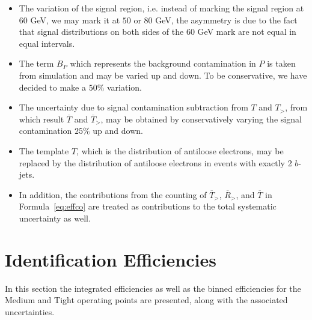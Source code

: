 \begin{itemize}[label=]


	\item The variation of the signal region, i.e. instead of marking the signal
	      region at $60$ GeV, we may mark it at $50$ or $80$ GeV, the asymmetry is due to
	      the fact that signal distributions on both sides of the $60$ GeV mark are not
	      equal in equal intervals.


	\item The term $B_P$ which represents the background contamination in $P$ is
	      taken from simulation and may be varied up and down. To be conservative, we
	      have decided to make a $50\%$ variation.


	\item The uncertainty due to signal contamination subtraction from $T$ and
	      $T_>$, from which result $\overline{T}$ and $\overline{T}_>$, may be obtained
	      by conservatively varying the signal contamination $25\%$ up and down.

	\item The template $T$, which is the distribution of antiloose electrons, may
	      be replaced by the distribution of antiloose electrons in events with exactly 2
	      $b$-jets.


	\item In addition, the contributions from the counting of $\overline{T}_>$,
	      $\overline{R}_>$, and $\overline{T}$ in Formula~\ref{eq:effco} are treated as
	      contributions to the total systematic uncertainty as well.


\end{itemize}



\section{Identification Efficiencies}\label{s:eideff}

In this section the integrated efficiencies as well as the binned efficiencies
for the Medium and Tight operating points are presented, along with the
associated uncertainties.


